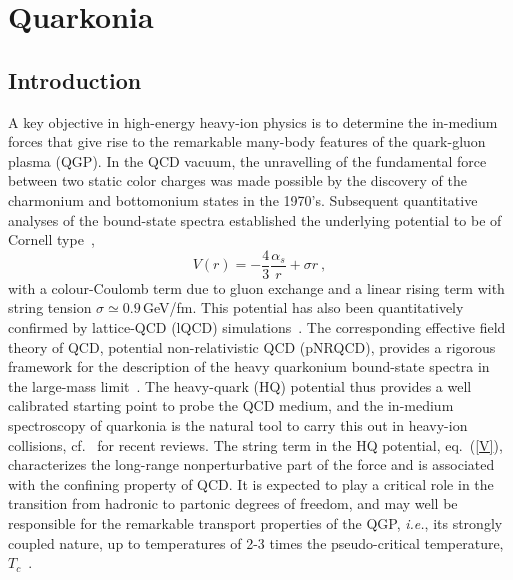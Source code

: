 \documentclass[../report.tex]{subfiles}
\begin{document}
\section{Quarkonia}

\subsection{Introduction}
\label{sec_intro}
A key objective in high-energy heavy-ion physics is to determine the in-medium forces 
that give rise to the remarkable many-body features of the quark-gluon plasma (QGP).
In the QCD vacuum, the unravelling of the fundamental force between two static color charges  
was made possible by the discovery of the charmonium and bottomonium states in the 1970's. 
Subsequent quantitative analyses of the bound-state spectra established the underlying
potential to be of Cornell type~\cite{Eichten:1979ms}, 
\begin{equation}
V(r) = -\frac{4}{3} \frac{\alpha_s}{r} + \sigma r \ ,
\label{V}
\end{equation} 
with a colour-Coulomb term due to gluon exchange and a linear rising term with string
tension $\sigma\simeq0.9$\,GeV/fm. This potential has also been quantitatively confirmed 
by lattice-QCD (lQCD) simulations~\cite{Bali:2000gf}. 
The corresponding effective field theory of QCD, potential non-relativistic QCD
(pNRQCD), provides a rigorous framework for the description of the heavy quarkonium
bound-state spectra in the large-mass limit~\cite{Brambilla:2004wf}.
The heavy-quark (HQ) potential thus provides a well calibrated starting point to probe the 
QCD medium, and the in-medium spectroscopy of quarkonia is the natural tool to carry this 
out in heavy-ion collisions, cf.~\cite{Rapp:2008tf,BraunMunzinger:2009ih,Kluberg:2009wc,Mocsy:2013syh,Liu:2015izf} 
for recent reviews.
The string term in the HQ potential, eq.~(\ref{V}), characterizes the long-range nonperturbative 
part of the force and is associated with the confining property of QCD. It is expected to play 
a critical role in the transition from hadronic to partonic degrees of freedom, and may well be 
responsible for the remarkable transport properties of the QGP, {\it i.e.}, its strongly coupled 
nature, up to temperatures of 2-3 times the pseudo-critical temperature, $T_c$~\cite{Liu:2016ysz}. 
\end{document}
